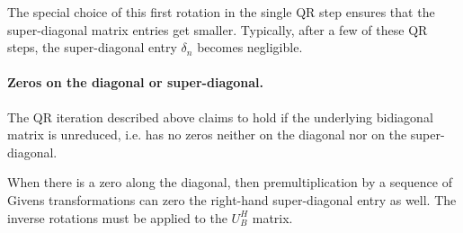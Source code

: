 The special choice of this first rotation in the single QR step
ensures that the super-diagonal matrix entries get smaller.
Typically, after a few of these QR steps, the super-diagonal entry
$\delta_n$ becomes negligible.

\paragraph{Zeros on the diagonal or super-diagonal.}

The QR iteration described above claims to hold if the underlying
bidiagonal matrix is unreduced, i.e. has no zeros neither on the
diagonal nor on the super-diagonal.

\addvspace{12pt}

When there is a zero along the diagonal, then premultiplication by a
sequence of Givens transformations can zero the right-hand
super-diagonal entry as well.  The inverse rotations must be applied
to the $U_B^H$ matrix.
